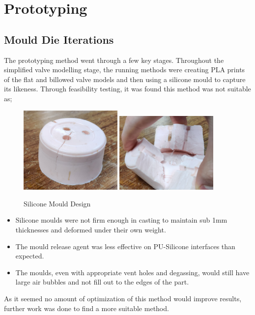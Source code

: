 



\section{Prototyping}
\subsection{Mould Die Iterations}
The prototyping method went through a few key stages. Throughout the simplified valve modelling stage, the running methods were creating \gls{PLA} prints of the flat and billowed valve models and then using a silicone mould to capture its likeness. Through feasibility testing, it was found this method was not suitable as;
\begin{figure}
    \centering
    \includegraphics[width=0.45\textwidth]{figures/silicone mould}
    \includegraphics[width=0.45\textwidth]{figures/silicone mould open}
    \caption{Silicone Mould Design}
    \label{fig:silimould}
\end{figure}
\begin{itemize}
    \item Silicone moulds were not firm enough in casting to maintain sub 1mm thicknesses and deformed under their own weight.
    \item The mould release agent was less effective on \gls{PU}-Silicone interfaces than expected.
    \item The moulds, even with appropriate vent holes and degassing, would still have large air bubbles and not fill out to the edges of the part.
\end{itemize}
As it seemed no amount of optimization of this method would improve results, further work was done to find a more suitable method.

